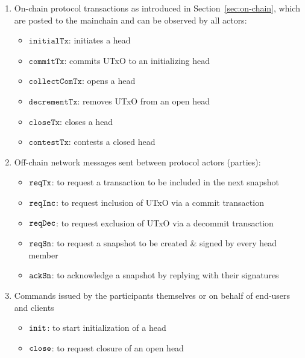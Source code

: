\begin{enumerate}
	\item On-chain protocol transactions as introduced in
	      Section~\ref{sec:on-chain}, which are posted to the mainchain and can be
	      observed by all actors:
	      \begin{itemize}
		      \item $\mathtt{initialTx}$: initiates a head
		      \item $\mathtt{commitTx}$: commits UTxO to an initializing head
		      \item $\mathtt{collectComTx}$: opens a head
		      \item $\mathtt{decrementTx}$: removes UTxO from an open head
		      \item $\mathtt{closeTx}$: closes a head
		      \item $\mathtt{contestTx}$: contests a closed head
	      \end{itemize}
	\item Off-chain network messages sent between protocol actors (parties):
	      \begin{itemize}
		      \item $\mathtt{reqTx}$: to request a transaction to be included in the next snapshot
		      \item $\mathtt{reqInc}$: to request inclusion of UTxO via a commit transaction
		      \item $\mathtt{reqDec}$: to request exclusion of UTxO via a decommit transaction
		      \item $\mathtt{reqSn}$: to request a snapshot to be created \& signed by every head member
		      \item $\mathtt{ackSn}$: to acknowledge a snapshot by replying with their signatures
	      \end{itemize}
	\item Commands issued by the participants themselves or on behalf of end-users and clients
	      \begin{itemize}
		      \item $\mathtt{init}$: to start initialization of a head
		      \item $\mathtt{close}$: to request closure of an open head
	      \end{itemize}
\end{enumerate}



